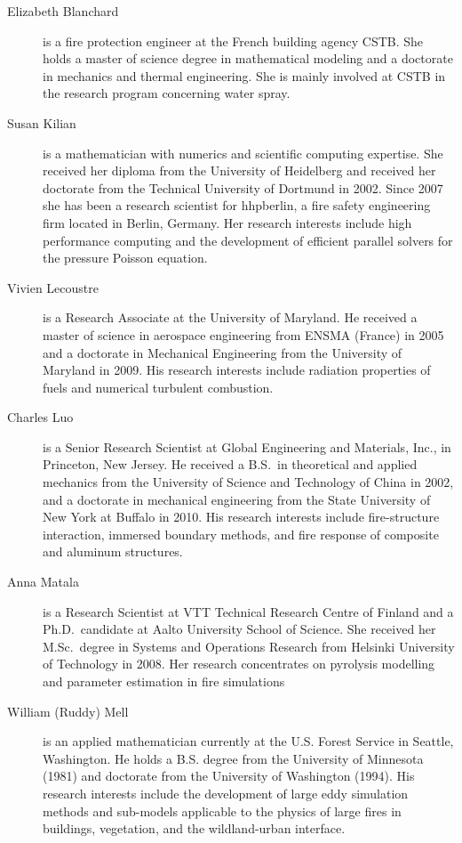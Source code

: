 \begin{description}

\item[Elizabeth Blanchard] is a fire protection engineer at the French building agency CSTB. She holds a master of science degree in mathematical modeling and a doctorate in mechanics and thermal engineering. She is mainly involved at CSTB in the research program concerning water spray.

\item[Susan Kilian] is a mathematician with numerics and scientific computing expertise. She received her diploma from the University of Heidelberg and received her doctorate from the Technical University of Dortmund in 2002. Since 2007 she has been a research scientist for hhpberlin, a fire safety engineering firm located in Berlin, Germany. Her research interests include high performance computing and the development of efficient parallel solvers for the pressure Poisson equation.

\item[Vivien Lecoustre] is a Research Associate at the University of Maryland. He received a master of science in aerospace engineering from ENSMA (France) in 2005 and a doctorate in Mechanical Engineering from the University of Maryland in 2009. His research interests include radiation properties of fuels and numerical turbulent combustion.

\item[Charles Luo] is a Senior Research Scientist at Global Engineering and Materials, Inc., in Princeton, New Jersey. He received a B.S.~in theoretical and applied mechanics from the University of Science and Technology of China in 2002, and a doctorate in mechanical engineering from the State University of New York at Buffalo in 2010. His research interests include fire-structure interaction, immersed boundary methods, and fire response of composite and aluminum structures.

\item[Anna Matala] is a Research Scientist at VTT Technical Research Centre of Finland and a Ph.D.~candidate at Aalto University School of Science. She received her M.Sc.~degree in Systems and Operations Research from Helsinki University of Technology in 2008. Her research concentrates on pyrolysis modelling and parameter estimation in fire simulations

\item[William (Ruddy) Mell] is an applied mathematician currently at the U.S. Forest Service in Seattle, Washington. He holds a B.S. degree from the University of Minnesota (1981) and doctorate from the University of Washington (1994). His research interests include the development of large eddy simulation methods and sub-models applicable to the physics of large fires in buildings, vegetation, and the wildland-urban interface.


\end{description}
